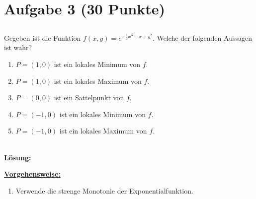 \section*{Aufgabe 3 (30 Punkte)}
\vspace{0.4cm}
\subsection*{}
Gegeben ist die Funktion $ f(x,y) = e^{-\frac{1}{3} x^3 + x +y^2 } $.
Welche der folgenden Aussagen ist wahr?
\renewcommand{\labelenumi}{(\alph{enumi})}
\begin{enumerate}
	\item 
	$ P = (1,0) $ ist ein lokales Minimum von $ f $.
	\item
	$ P = (1,0) $ ist ein lokales Maximum von $ f $.
	\item
	$ P = (0,0) $ ist ein Sattelpunkt von $ f $.
	\item 
	$ P = (-1,0) $ ist ein lokales Minimum von $ f $.
	\item
	$ P = (-1,0) $ ist ein lokales Maximum von $ f $.
\end{enumerate}
\ \\
\textbf{Lösung:}
\begin{mdframed}
\underline{\textbf{Vorgehensweise:}}
\renewcommand{\labelenumi}{\theenumi.}
\begin{enumerate}
\item Verwende die strenge Monotonie der Exponentialfunktion.
\end{enumerate}
\end{mdframed}

